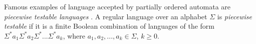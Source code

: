 Famous examples of language accepted by partially ordered automata are \textit{piecewise testable languages} \cite*{simon1972hierarchies, masopust2019partially}. A regular language over an alphabet $\Sigma$ is \textit{piecewise testable} if it is a finite Boolean combination of languages of the form $\Sigma^*a_1\Sigma^*a_2\Sigma^* ... \Sigma^*a_k$, where $a_1, a_2, ... , a_k \in \Sigma$, $k \ge 0$. 